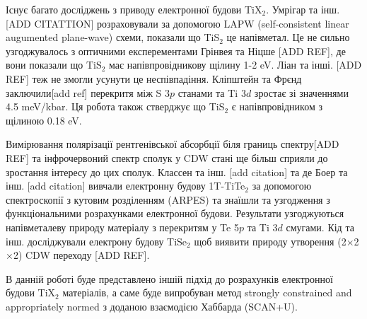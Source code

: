 Існує багато досліджень з приводу електронної будови TiX$_2$. Умрігар та інш. [ADD CITATTION] розраховували за допомогою LAPW (self-consistent linear augumented plane-wave) схеми, показали що TiS$_2$ це напівметал. Це не сильно узгоджувалось з оптичними експерементами Грінвея та Ніцше [ADD REF], де вони показали що TiS$_2$ має напівпровідникову щілину 1-2 eV. Ліан та інші. [ADD REF] теж не змогли усунути це неспівпадіння. Кліпштейн та Фрєнд заключили[add ref] перекритя між S $3p$ станами та Ti $3d$ зростає зі значеннями 4.5 meV/kbar. Ця робота також стверджує що TiS$_2$ є напівпровідником з щілиною 0.18 eV. 

Вимірювання полярізації рентгенівської абсорбції біля границь спектру[ADD REF] та інфрочервоний спектр сполук у CDW стані ще більш сприяли до зростання інтересу до цих сполук. Классен та інш. [add citation] та де Боер та інш. [add citation] вивчали електронну будову 1T-TiTe$_2$  за допомогою спектроскопії з кутовим розділенням (ARPES) та знаїшли та узгодження з функціональними розрахунками електронної будови. Результати узгоджуються напівметалеву природу матеріалу з перекритям у Te 5$p$ та Ti $3d$ смугами. Кід та інш. досліджували електрону будову TiSe$_2$ щоб виявити природу утворення (2$\times$2$\times$2) CDW переходу [ADD REF].

В данній роботі буде представлено іншій підхід до розрахунків електронної будови TiX$_2$ матеріалів, а саме буде випробуван метод strongly constrained and appropriately normed з доданою взаємодією Хаббарда (SCAN+U). 

